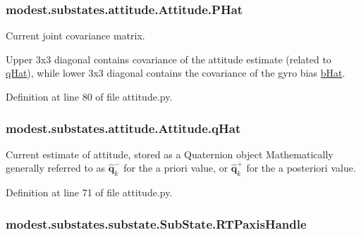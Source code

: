 \subsubsection[{\texorpdfstring{P\+Hat}{PHat}}]{\setlength{\rightskip}{0pt plus 5cm}modest.\+substates.\+attitude.\+Attitude.\+P\+Hat}\hypertarget{classmodest_1_1substates_1_1attitude_1_1Attitude_a2f79616ca660e0cc1e628adf94738249}{}\label{classmodest_1_1substates_1_1attitude_1_1Attitude_a2f79616ca660e0cc1e628adf94738249}


Current joint covariance matrix. 

Upper 3x3 diagonal contains covariance of the attitude estimate (related to \hyperlink{classmodest_1_1substates_1_1attitude_1_1Attitude_a22a550534d908153baef2e52f7142c5e}{q\+Hat}), while lower 3x3 diagonal contains the covariance of the gyro bias \hyperlink{classmodest_1_1substates_1_1attitude_1_1Attitude_aac0bc92dc53893d2f190c1252690053c}{b\+Hat}. 

Definition at line 80 of file attitude.\+py.

\subsubsection[{\texorpdfstring{q\+Hat}{qHat}}]{\setlength{\rightskip}{0pt plus 5cm}modest.\+substates.\+attitude.\+Attitude.\+q\+Hat}\hypertarget{classmodest_1_1substates_1_1attitude_1_1Attitude_a22a550534d908153baef2e52f7142c5e}{}\label{classmodest_1_1substates_1_1attitude_1_1Attitude_a22a550534d908153baef2e52f7142c5e}


Current estimate of attitude, stored as a Quaternion object Mathematically generally referred to as $\mathbf{\hat{q}}^{-}_{k}$ for the a priori value, or $\mathbf{\hat{q}}^{+}_{k}$ for the a posteriori value. 



Definition at line 71 of file attitude.\+py.

\subsubsection[{\texorpdfstring{R\+T\+Paxis\+Handle}{RTPaxisHandle}}]{\setlength{\rightskip}{0pt plus 5cm}modest.\+substates.\+substate.\+Sub\+State.\+R\+T\+Paxis\+Handle\hspace{0.3cm}{\ttfamily [inherited]}}\hypertarget{classmodest_1_1substates_1_1substate_1_1SubState_a497ccbb6658589b02568e87c6382222e}{}\label{classmodest_1_1substates_1_1substate_1_1SubState_a497ccbb6658589b02568e87c6382222e}


